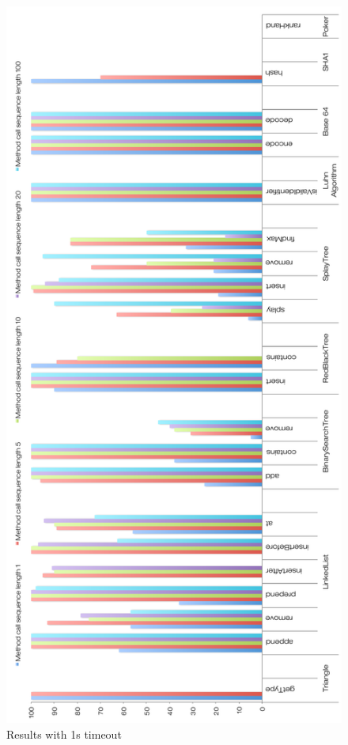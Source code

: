 \begin{figure}[h]
\vspace*{-2.5cm}
\centering
\includegraphics[scale=0.56]{./components/chapter7/1sr.pdf}
\caption{Results with 1s timeout}
\label{1s}
\end{figure}


